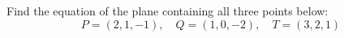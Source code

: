 \documentclass[openany]{book}
\begin{document}
\begin{prob}
    Find the equation of the plane containing all three points below:
    \begin{equation*}
        P=(2,1,-1), \quad Q=(1,0,-2), \quad T=(3,2,1)
    \end{equation*}
\end{prob}
\end{document}
